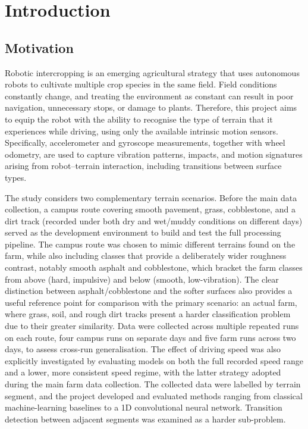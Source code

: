 \chapter{Introduction}
\label{ch:introduction}

\section{Motivation}

Robotic intercropping is an emerging agricultural strategy that uses autonomous robots to cultivate multiple crop species in the same field. Field conditions constantly change, and treating the environment as constant can result in poor navigation, unnecessary stops, or damage to plants\cite{RoboticIntercroppingProject2026}. Therefore, this project aims to equip the robot with the ability to recognise the type of terrain that it experiences while driving, using only the available intrinsic motion sensors. Specifically, accelerometer and gyroscope measurements, together with wheel odometry, are used to capture vibration patterns, impacts, and motion signatures arising from robot–terrain interaction, including transitions between surface types.

The study considers two complementary terrain scenarios. Before the main data collection, a campus route covering smooth pavement, grass, cobblestone, and a dirt track (recorded under both dry and wet/muddy conditions on different days) served as the development environment to build and test the full processing pipeline. The campus route was chosen to mimic different terrains found on the farm, while also including classes that provide a deliberately wider roughness contrast, notably smooth asphalt and cobblestone, which bracket the farm classes from above (hard, impulsive) and below (smooth, low-vibration). The clear distinction between asphalt/cobblestone and the softer surfaces also provides a useful reference point for comparison with the primary scenario: an actual farm, where grass, soil, and rough dirt tracks present a harder classification problem due to their greater similarity. Data were collected across multiple repeated runs on each route, four campus runs on separate days and five farm runs across two days, to assess cross-run generalisation. The effect of driving speed was also explicitly investigated by evaluating models on both the full recorded speed range and a lower, more consistent speed regime, with the latter strategy adopted during the main farm data collection. The collected data were labelled by terrain segment, and the project developed and evaluated methods ranging from classical machine-learning baselines to a 1D convolutional neural network. Transition detection between adjacent segments was examined as a harder sub-problem.

